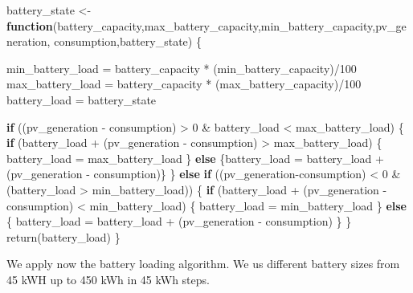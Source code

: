\documentclass[
]{article}
\newenvironment{Shaded}{\begin{snugshade}}{\end{snugshade}}
\newcommand{\ControlFlowTok}[1]{\textcolor[rgb]{0.13,0.29,0.53}{\textbf{#1}}}
\newcommand{\DecValTok}[1]{\textcolor[rgb]{0.00,0.00,0.81}{#1}}
\newcommand{\FunctionTok}[1]{\textcolor[rgb]{0.00,0.00,0.00}{#1}}
\newcommand{\NormalTok}[1]{#1}
\newcommand{\OtherTok}[1]{\textcolor[rgb]{0.56,0.35,0.01}{#1}}
\newcommand{\SpecialCharTok}[1]{\textcolor[rgb]{0.00,0.00,0.00}{#1}}
\begin{document}
\begin{Shaded}
\begin{Highlighting}[]
\NormalTok{battery\_state }\OtherTok{\textless{}{-}} \ControlFlowTok{function}\NormalTok{(battery\_capacity,max\_battery\_capacity,min\_battery\_capacity,pv\_generation, consumption,battery\_state) \{}
  
\NormalTok{  min\_battery\_load }\OtherTok{=}\NormalTok{ battery\_capacity }\SpecialCharTok{*}\NormalTok{ (min\_battery\_capacity)}\SpecialCharTok{/}\DecValTok{100}
\NormalTok{  max\_battery\_load }\OtherTok{=}\NormalTok{ battery\_capacity }\SpecialCharTok{*}\NormalTok{ (max\_battery\_capacity)}\SpecialCharTok{/}\DecValTok{100}
\NormalTok{  battery\_load }\OtherTok{=}\NormalTok{ battery\_state}
  
  \ControlFlowTok{if}\NormalTok{ ((pv\_generation }\SpecialCharTok{{-}}\NormalTok{ consumption) }\SpecialCharTok{\textgreater{}} \DecValTok{0} \SpecialCharTok{\&}\NormalTok{ battery\_load }\SpecialCharTok{\textless{}}\NormalTok{ max\_battery\_load) \{}
    \ControlFlowTok{if}\NormalTok{ (battery\_load }\SpecialCharTok{+}\NormalTok{ (pv\_generation }\SpecialCharTok{{-}}\NormalTok{ consumption) }\SpecialCharTok{\textgreater{}}\NormalTok{ max\_battery\_load) \{}
\NormalTok{      battery\_load }\OtherTok{=}\NormalTok{ max\_battery\_load  }
\NormalTok{    \} }\ControlFlowTok{else} 
\NormalTok{    \{battery\_load }\OtherTok{=}\NormalTok{ battery\_load }\SpecialCharTok{+}\NormalTok{ (pv\_generation }\SpecialCharTok{{-}}\NormalTok{ consumption)\} }
\NormalTok{  \}}
  \ControlFlowTok{else} \ControlFlowTok{if}\NormalTok{ ((pv\_generation}\SpecialCharTok{{-}}\NormalTok{consumption) }\SpecialCharTok{\textless{}} \DecValTok{0} \SpecialCharTok{\&}\NormalTok{ (battery\_load }\SpecialCharTok{\textgreater{}}\NormalTok{ min\_battery\_load)) \{}
    \ControlFlowTok{if}\NormalTok{ (battery\_load }\SpecialCharTok{+}\NormalTok{ (pv\_generation }\SpecialCharTok{{-}}\NormalTok{ consumption) }\SpecialCharTok{\textless{}}\NormalTok{ min\_battery\_load) \{}
\NormalTok{      battery\_load }\OtherTok{=}\NormalTok{ min\_battery\_load }
\NormalTok{    \} }\ControlFlowTok{else}\NormalTok{ \{}
\NormalTok{      battery\_load }\OtherTok{=}\NormalTok{ battery\_load }\SpecialCharTok{+}\NormalTok{ (pv\_generation }\SpecialCharTok{{-}}\NormalTok{ consumption) \}}
\NormalTok{  \}}
   \FunctionTok{return}\NormalTok{(battery\_load) }
\NormalTok{\}  }
\end{Highlighting}
\end{Shaded}

We apply now the battery loading algorithm. We us different battery
sizes from 45 kWH up to 450 kWh in 45 kWh steps.
\end{document}
